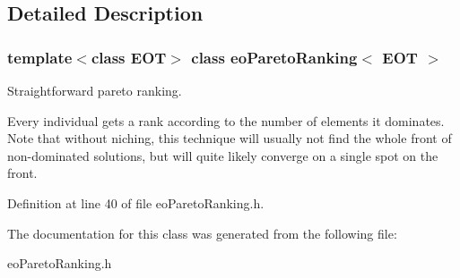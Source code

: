 \subsection{Detailed Description}
\subsubsection*{template$<$class EOT$>$ class eo\-Pareto\-Ranking$<$ EOT $>$}

Straightforward pareto ranking. 

Every individual gets a rank according to the number of elements it dominates. Note that without niching, this technique will usually not find the whole front of non-dominated solutions, but will quite likely converge on a single spot on the front. 



Definition at line 40 of file eo\-Pareto\-Ranking.h.

The documentation for this class was generated from the following file:\begin{CompactItemize}
\item 
eo\-Pareto\-Ranking.h\end{CompactItemize}
